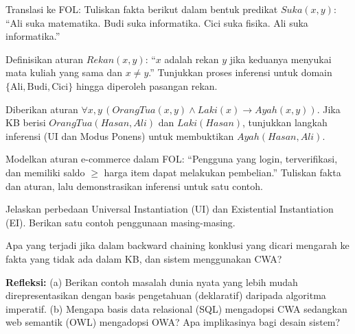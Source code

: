 \documentclass[../main]{subfiles}
\begin{document}

\begin{latihan}
  \item Translasi ke FOL: Tuliskan fakta berikut dalam bentuk predikat $Suka(x, y)$: ``Ali suka matematika. Budi suka informatika. Cici suka fisika. Ali suka informatika.''
  \item Definisikan aturan $Rekan(x, y)$: ``$x$ adalah rekan $y$ jika keduanya menyukai mata kuliah yang sama dan $x \neq y$.'' Tunjukkan proses inferensi untuk domain $\{\text{Ali}, \text{Budi}, \text{Cici}\}$ hingga diperoleh pasangan rekan.
  \item Diberikan aturan $\forall x, y\, (OrangTua(x, y) \wedge Laki(x) \rightarrow Ayah(x, y))$. Jika KB berisi $OrangTua(Hasan, Ali)$ dan $Laki(Hasan)$, tunjukkan langkah inferensi (UI dan Modus Ponens) untuk membuktikan $Ayah(Hasan, Ali)$.
  \item Modelkan aturan e-commerce dalam FOL: ``Pengguna yang login, terverifikasi, dan memiliki saldo $\ge$ harga item dapat melakukan pembelian.'' Tuliskan fakta dan aturan, lalu demonstrasikan inferensi untuk satu contoh.
  \item Jelaskan perbedaan Universal Instantiation (UI) dan Existential Instantiation (EI). Berikan satu contoh penggunaan masing-masing.
  \item Apa yang terjadi jika dalam backward chaining konklusi yang dicari mengarah ke fakta yang tidak ada dalam KB, dan sistem menggunakan CWA?
  \item \textbf{Refleksi:} (a) Berikan contoh masalah dunia nyata yang lebih mudah direpresentasikan dengan basis pengetahuan (deklaratif) daripada algoritma imperatif. (b) Mengapa basis data relasional (SQL) mengadopsi CWA sedangkan web semantik (OWL) mengadopsi OWA? Apa implikasinya bagi desain sistem?
\end{latihan}

\end{document}
